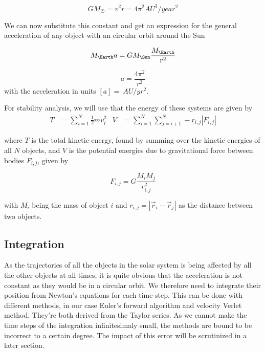 \documentclass[10pt]{article}
\begin{document}
\begin{multicols}{2}
\begin{equation}
    GM_\Sun = v^2r = 4\pi^2AU^3/year^2
\end{equation}

We can now substitute this constant and get an expression for the general
acceleration of any object with an circular orbit around the Sun

\begin{equation}
    M_\Earth a = GM_\Sun\frac{M_\Earth}{r^2}
\end{equation}

\begin{equation}
    a = \frac{4\pi^2}{r^2}
\end{equation}
with the acceleration in units $[a] = \SI{}{AU/yr^2}$. 

For stability analysis, we will use that the energy of these systems are given by 
\begin{align}\label{eq:energies}
    T &= \sum_{i=1}^N \frac{1}{2}mv_i^2 & V &= \sum_{i=1}^N \sum_{j=i+1}^N
    -r_{i,j}|F_{i,j}|
\end{align}

where $T$ is the total kinetic energy, found by summing over the kinetic
energies of all $N$ objects, and $V$ is the potential energies due to
gravitational force between bodies $F_{i,j}$, given by

\begin{equation}
    F_{i,j} =  G\frac{M_iM_j}{r_{i,j}^2}
\end{equation}

with $M_i$ being the mass of object $i$ and $r_{i,j} = |\vec r_i - \vec
r_j|$ as the distance between two objects.


\subsection{Integration}
As the trajectories of all the objects in the solar system is being
affected by all the other objects at all times, it is quite obvious that
the acceleration is not constant as they would be in a circular orbit. We
therefore need to integrate their position from Newton's equations for each
time step. This can be done with different methods, in our case Euler's
forward algorithm and velocity Verlet method. They're both derived from the
Taylor series. As we cannot make the time steps of the integration
infinitesimaly small, the methods are bound to be incorrect to a certain
degree. The impact of this error will be scrutinized in a later section.


\end{multicols}
\end{document}
